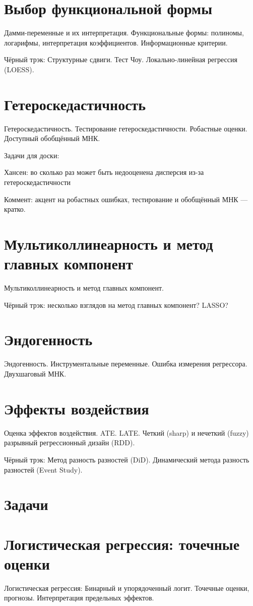 \documentclass[12pt]{article}
\newcommand{\ESS}{ESS}
\begin{document}
\section{Выбор функциональной формы}
Дамми-переменные и их интерпретация. Функциональные формы: полиномы, логарифмы, интерпретация коэффициентов. Информационные критерии.

Чёрный трэк: Структурные сдвиги. Тест Чоу. Локально-линейная регрессия (LO\ESS).

\section{Гетероскедастичность}
Гетероскедастичность. Тестирование гетероскедастичности. Робастные оценки. Доступный обобщённый МНК.

Задачи для доски:

Хансен: во сколько раз может быть недооценена дисперсия из-за гетероскедастичности


Коммент: акцент на робастных ошибках, тестирование и обобщённый МНК — кратко.

\section{Мультиколлинеарность и метод главных компонент}
Мультиколлинеарность и метод главных компонент.

Чёрный трэк: несколько взглядов на метод главных компонент? LASSO?


\section{Эндогенность}
Эндогенность. Инструментальные переменные. Ошибка измерения регрессора. Двухшаговый МНК.


\section{Эффекты воздействия}
Оценка эффектов воздействия. ATE. LATE. Четкий (sharp) и нечеткий (fuzzy) разрывный регрессионный дизайн (RDD).

Чёрный трэк: Метод разность разностей (DiD). Динамический метода разность разностей (Event Study).

\section{Задачи}

\section{Логистическая регрессия: точечные оценки}
Логистическая регрессия: Бинарный и упорядоченный логит. Точечные оценки, прогнозы.  Интерпретация предельных эффектов.
\end{document}
